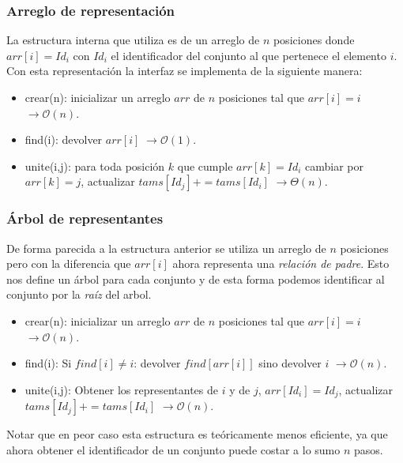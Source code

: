 \subsubsection{Arreglo de representaci\'on}
La estructura interna que utiliza es de un arreglo de $n$ posiciones donde $arr[i]=Id_i$ con $Id_i$ el identificador del conjunto al que pertenece el elemento $i$. Con esta representaci\'on la interfaz se implementa de la siguiente manera:
\begin{itemize}
	\item crear(n): inicializar un arreglo $arr$ de $n$ posiciones tal que $arr[i]=i$ $\rightarrow \mathcal{O}(n)$.
	\item find(i): devolver $arr[i] \; \rightarrow \mathcal{O}(1)$.
	\item unite(i,j): para toda posici\'on $k$ que cumple $arr[k]=Id_i$ cambiar por $arr[k]=j$, actualizar $tams[Id_j]+=tams[Id_i]$ $\rightarrow \Theta(n)$.
\end{itemize}

\subsubsection{Árbol de representantes}
De forma parecida a la estructura anterior se utiliza un arreglo de $n$ posiciones pero con la diferencia que $arr[i]$ ahora representa una \textit{relaci\'on de padre}. Esto nos define un árbol para cada conjunto y de esta forma podemos identificar al conjunto por la \textit{raíz} del arbol.

\begin{itemize}
	\item crear(n): inicializar un arreglo $arr$ de $n$ posiciones tal que $arr[i]=i$ $\rightarrow \mathcal{O}(n)$.
	\item find(i): Si $find[i]\neq i$: devolver $find[arr[i]]$ sino devolver $i$ $\rightarrow \mathcal{O}(n)$.
	\item unite(i,j): Obtener los representantes de $i$ y de $j$, $arr[Id_i]=Id_j$, actualizar $tams[Id_j]+=tams[Id_i]$ $\rightarrow \mathcal{O}(n)$.
\end{itemize}

\indent Notar que en peor caso esta estructura es te\'oricamente menos eficiente, ya que ahora obtener el identificador de un conjunto puede costar a lo sumo $n$ pasos.

